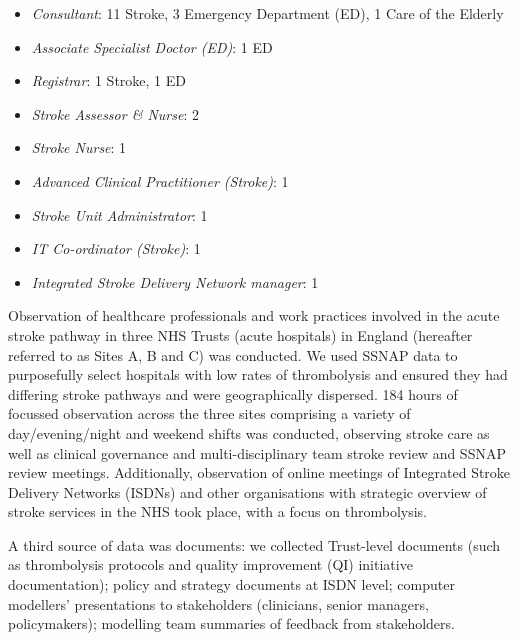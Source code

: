 \begin{itemize}

    \item \textit{Consultant}: 11 Stroke, 3 Emergency Department (ED), 1 Care of the Elderly

    \item \textit{Associate Specialist Doctor (ED)}: 1 ED

    \item \textit{Registrar}: 1 Stroke, 1 ED 

    \item \textit{Stroke Assessor \& Nurse}: 2

    \item \textit{Stroke Nurse}: 1
    
    \item \textit{Advanced Clinical Practitioner (Stroke)}: 1

    \item \textit{Stroke Unit Administrator}: 1

    \item \textit{IT Co-ordinator (Stroke)}: 1

    \item \textit{Integrated Stroke Delivery Network manager}: 1
    
\end{itemize}

Observation of healthcare professionals and work practices involved in the acute stroke pathway in three NHS Trusts (acute hospitals) in England (hereafter referred to as Sites A, B and C) was conducted. We used SSNAP data to purposefully select hospitals with low rates of thrombolysis and ensured they had differing stroke pathways and were geographically dispersed. 184 hours of focussed observation across the three sites comprising a variety of day/evening/night and weekend shifts was conducted, observing stroke care as well as clinical governance and multi-disciplinary team stroke review and SSNAP review meetings. Additionally, observation of online meetings of Integrated Stroke Delivery Networks (ISDNs) and other organisations with strategic overview of stroke services in the NHS took place, with a focus on thrombolysis. 

A third source of data was documents: we collected Trust-level documents (such as thrombolysis protocols and quality improvement (QI) initiative documentation); policy and strategy documents at ISDN level; computer modellers’ presentations to stakeholders (clinicians, senior managers, policymakers); modelling team summaries of feedback from stakeholders.

